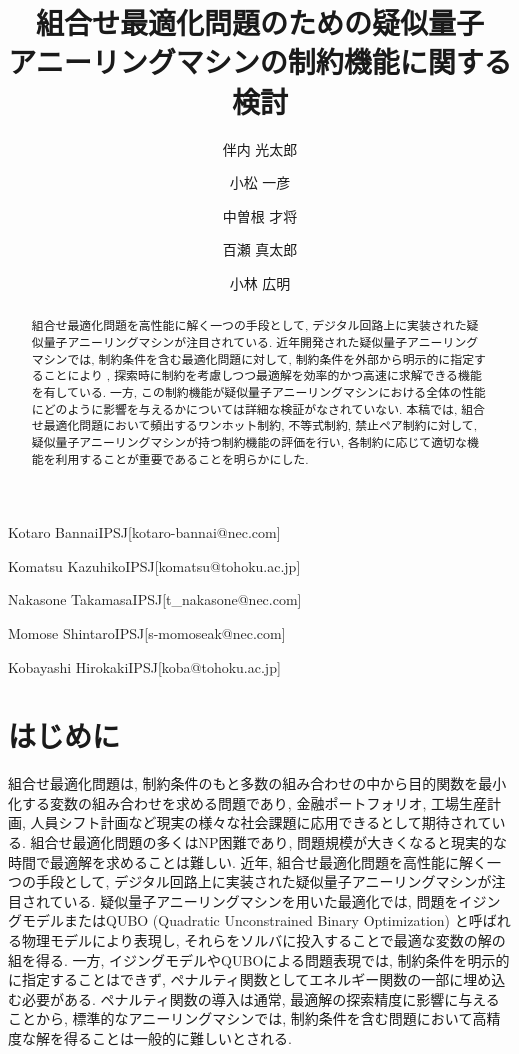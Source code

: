 \documentclass[submit,techrep,noauthor]{ipsj}
\begin{document}
\title{組合せ最適化問題のための疑似量子\\アニーリングマシンの制約機能に関する検討}

\author{伴内 光太郎}{Kotaro Bannai}{IPSJ}[kotaro-bannai@nec.com]
\author{小松 一彦}{Komatsu Kazuhiko}{IPSJ}[komatsu@tohoku.ac.jp]
\author{中曽根 才将}{Nakasone Takamasa}{IPSJ}[t\_nakasone@nec.com]
\author{百瀬 真太郎}{Momose Shintaro}{IPSJ}[s-momoseak@nec.com]
\author{小林 広明}{Kobayashi Hirokaki}{IPSJ}[koba@tohoku.ac.jp]

\begin{abstract}
組合せ最適化問題を高性能に解く一つの手段として, デジタル回路上に実装された疑似量子アニーリングマシンが注目されている. 近年開発された疑似量子アニーリングマシンでは, 制約条件を含む最適化問題に対して, 制約条件を外部から明示的に指定することにより
, 探索時に制約を考慮しつつ最適解を効率的かつ高速に求解できる機能を有している. 一方, この制約機能が疑似量子アニーリングマシンにおける全体の性能にどのように影響を与えるかについては詳細な検証がなされていない. 本稿では, 組合せ最適化問題において頻出するワンホット制約, 不等式制約, 禁止ペア制約に対して, 疑似量子アニーリングマシンが持つ制約機能の評価を行い, 各制約に応じて適切な機能を利用することが重要であることを明らかにした.
\end{abstract}

\maketitle

\section{はじめに}

組合せ最適化問題は, 制約条件のもと多数の組み合わせの中から目的関数を最小化する変数の組み合わせを求める問題であり, 金融ポートフォリオ, 工場生産計画, 人員シフト計画など現実の様々な社会課題に応用できるとして期待されている. 組合せ最適化問題の多くはNP困難であり, 問題規模が大きくなると現実的な時間で最適解を求めることは難しい. 近年, 組合せ最適化問題を高性能に解く一つの手段として, デジタル回路上に実装された疑似量子アニーリングマシンが注目されている. 疑似量子アニーリングマシンを用いた最適化では, 問題をイジングモデルまたはQUBO (Quadratic Unconstrained Binary Optimization) と呼ばれる物理モデルにより表現し, それらをソルバに投入することで最適な変数の解の組を得る. 一方, イジングモデルやQUBOによる問題表現では, 制約条件を明示的に指定することはできず, ペナルティ関数としてエネルギー関数の一部に埋め込む必要がある. ペナルティ関数の導入は通常, 最適解の探索精度に影響に与えることから, 標準的なアニーリングマシンでは, 制約条件を含む問題において高精度な解を得ることは一般的に難しいとされる.
\end{document}
